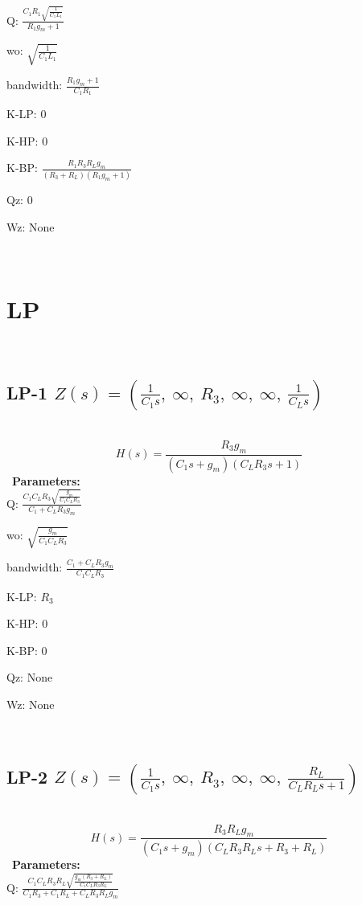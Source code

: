 \documentclass{article}
\begin{document}
Q: $\frac{C_{1} R_{1} \sqrt{\frac{1}{C_{1} L_{1}}}}{R_{1} g_{m} + 1}$\ 

wo: $\sqrt{\frac{1}{C_{1} L_{1}}}$\ 

bandwidth: $\frac{R_{1} g_{m} + 1}{C_{1} R_{1}}$\ 

K-LP: $0$\ 

K-HP: $0$\ 

K-BP: $\frac{R_{1} R_{3} R_{L} g_{m}}{\left(R_{3} + R_{L}\right) \left(R_{1} g_{m} + 1\right)}$\ 

Qz: $0$\ 

Wz: $\text{None}$\ 

\ 

\section{LP}\ 
\subsection{LP-1 $Z(s) = \left( \frac{1}{C_{1} s}, \  \infty, \  R_{3}, \  \infty, \  \infty, \  \frac{1}{C_{L} s}\right)$ } \ 
\textbf{\[H(s) = \frac{R_{3} g_{m}}{\left(C_{1} s + g_{m}\right) \left(C_{L} R_{3} s + 1\right)}\] } \ 
\textbf{Parameters:}\\ 

Q: $\frac{C_{1} C_{L} R_{3} \sqrt{\frac{g_{m}}{C_{1} C_{L} R_{3}}}}{C_{1} + C_{L} R_{3} g_{m}}$\ 

wo: $\sqrt{\frac{g_{m}}{C_{1} C_{L} R_{3}}}$\ 

bandwidth: $\frac{C_{1} + C_{L} R_{3} g_{m}}{C_{1} C_{L} R_{3}}$\ 

K-LP: $R_{3}$\ 

K-HP: $0$\ 

K-BP: $0$\ 

Qz: $\text{None}$\ 

Wz: $\text{None}$\ 

\ 

\subsection{LP-2 $Z(s) = \left( \frac{1}{C_{1} s}, \  \infty, \  R_{3}, \  \infty, \  \infty, \  \frac{R_{L}}{C_{L} R_{L} s + 1}\right)$ } \ 
\textbf{\[H(s) = \frac{R_{3} R_{L} g_{m}}{\left(C_{1} s + g_{m}\right) \left(C_{L} R_{3} R_{L} s + R_{3} + R_{L}\right)}\] } \ 
\textbf{Parameters:}\\ 

Q: $\frac{C_{1} C_{L} R_{3} R_{L} \sqrt{\frac{g_{m} \left(R_{3} + R_{L}\right)}{C_{1} C_{L} R_{3} R_{L}}}}{C_{1} R_{3} + C_{1} R_{L} + C_{L} R_{3} R_{L} g_{m}}$\ 
\end{document}
